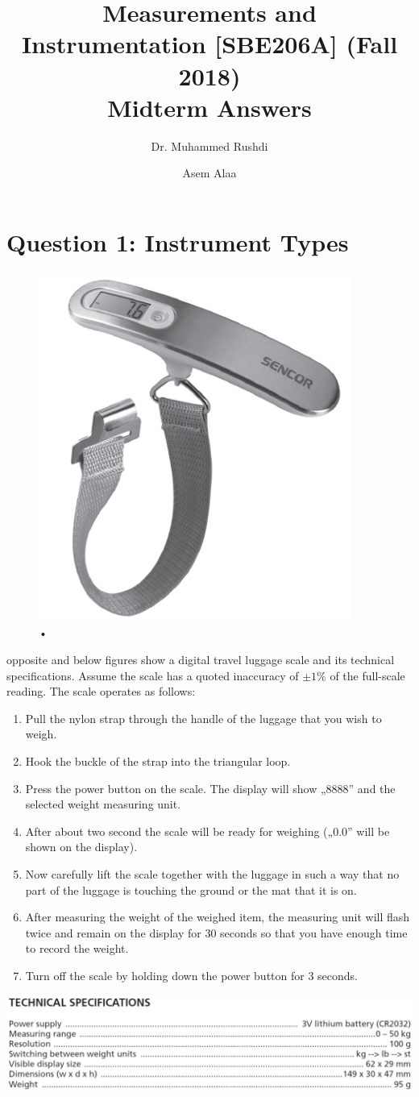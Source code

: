 \documentclass[a4paper,11pt,dvipsnames]{book}
\begin{document}
\author{Dr. Muhammed Rushdi \and Asem Alaa}

\title{Measurements and Instrumentation [SBE206A] (Fall 2018)\\ Midterm Answers}

\maketitle


\chapter*{Question 1: Instrument Types}



\begin{question}

\begin{figure}[h!]
\centering
\includegraphics[width=0.3\linewidth]{scale} 
\caption{•}
\end{figure}

opposite and below figures show a digital travel luggage scale and its technical specifications. Assume the scale has a quoted inaccuracy of $\pm 1\%$ of the full-scale reading. The scale operates as follows:
\begin{enumerate}
\item Pull the nylon strap through the handle of the luggage that you wish to weigh.
\item Hook the buckle of the strap into the triangular loop.
\item Press the power button on the scale. The display will show „8888” and the selected weight measuring unit. 
\item After about two second the scale will be ready for weighing („0.0” will be shown on the display).
\item Now carefully lift the scale together with the luggage in such a way that no part of the luggage is touching the ground or the mat that it is on.
\item After measuring the weight of the weighed item, the measuring unit will flash twice and remain on the display for 30 seconds so that you have enough time to record the weight.
\item Turn off the scale by holding down the power button for 3 seconds. 
\end{enumerate}
{\centering
\includegraphics[width=0.8\linewidth]{q1} 
}


\end{question}
\end{document}
